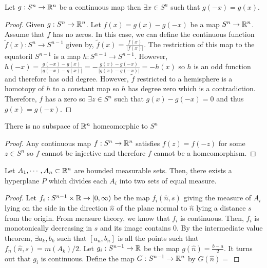 \documentclass[12pt]{extarticle}
\begin{document}
\begin{theorem}
Let $g : S^n \to \mathbb{R}^n$ be a continuous map then $\exists x \in S^n$ such that $g(-x) = g(x)$. 
\end{theorem}

\begin{proof}
Given $g : S^n \to \mathbb{R}^n$. Let $f(x) = g(x) - g(-x)$ be a map $S^n \to \mathbb{R}^n$. Assume that $f$ has no zeros. In this case, we can define the continuous function $\tilde{f}(x) : S^n \to S^{n-1}$ given by, $\tilde{f}(x) = \frac{f(x)}{|f(x)|}$. The restriction of this map to the equatoril $S^{n-1}$ is a map $h : S^{n-1} \to S^{n-1}$. However, $h(-x) = \frac{g(-x) - g(x)}{|g(-x) - g(x)|} = - \frac{g(x) - g(-x)}{|g(x) - g(-x)|} = - h(x)$ so $h$ is an odd function and therefore has odd degree. However, $\tilde{f}$ restricted to a hemisphere is a homotopy of $h$ to a constant map so $h$ has degree zero which is a contradiction. Therefore, $f$ has a zero so $\exists z \in S^n$ such that $g(x) - g(-x) = 0$ and thus $g(x) = g(-x)$.  
\end{proof}

\begin{corollary}
There is no subspace of $\mathbb{R}^n$ homeomorphic to $S^n$
\end{corollary}

\begin{proof}
Any continuous map $f : S^n \to \mathbb{R}^n$ satisfies $f(z) = f(-z)$ for some $z \in S^n$ so $f$ cannot be injective and therefore $f$ cannot be a homeomorphism.  
\end{proof}

\begin{corollary}
Let $A_1, \cdots, A_n \subset \mathbb{R}^n$ are bounded measurable sets. Then, there exists a hyperplane $P$ which divides each $A_i$ into two sets of equal measure.
\end{corollary}

\begin{proof}
Let $f_i : S^{n-1} \times \mathbb{R} \to [0, \infty)$ be the map $f_i(\hat{n},s)$ giving the measure of $A_i$ lying on the side in the direction $\hat{n}$ of the plane normal to $\hat{n}$ lying a distance $s$ from the origin. From measure theory, we know that $f_i$ is continuous. Then, $f_i$ is monotonically decreasing in $s$ and its image contains $0$. By the intermediate value theorem, $\exists a_k, b_k$ such that $[a_n, b_n]$ is all the points such that $f_n(\hat{n}, s) = m(A_k)/2$. Let $g_i : S^{n-1} \to \mathbb{R}$ be the map $g(\hat{n}) = \frac{b-a}{2}$. It turns out that $g_i$ is continuous. Define the map $G : S^{n-1} \to \mathbb{R}^n$ by $G(\hat{n}) = $
\end{proof}
\end{document}
